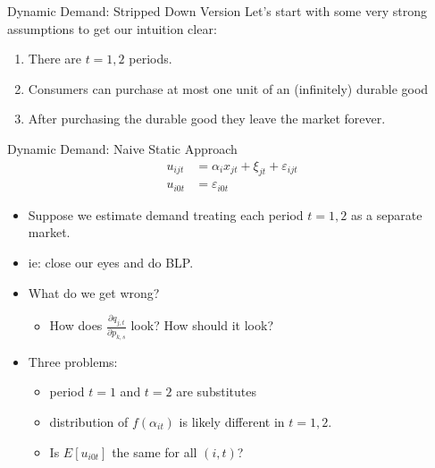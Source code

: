 \documentclass[xcolor=pdftex,dvipsnames,table,mathserif,aspectratio=169]{beamer}
\begin{document}
%




\begin{frame}{Dynamic Demand: Stripped Down Version}
Let's start with some very strong assumptions to get our intuition clear:
\begin{enumerate}
\item There are $t=1,2$ periods.
\item Consumers can purchase at most one unit of an (infinitely) durable good
\item After purchasing the durable good they leave the market forever.
\end{enumerate}
\end{frame}

\begin{frame}{Dynamic Demand: Naive Static Approach}
\begin{align*}
u_{ijt} &=   \alpha_i x_{jt}  +  \xi_{jt} + \varepsilon_{ijt}\\
u_{i0t} &=  \varepsilon_{i0t} 
\end{align*}
\begin{itemize}
\item Suppose  we estimate demand treating each period $t=1,2$ as a \alert{separate market}.
\item ie: close our eyes and do BLP.
\item What do we get wrong?
\begin{itemize}
\item How does $\frac{\partial q_{j,t}}{\partial p_{k,s}}$ look? How should it look?
\end{itemize}
\item Three problems: 
\begin{itemize}
\item period $t=1$ and $t=2$ are \alert{substitutes}
\item distribution of $f(\alpha_{it})$ is likely different in $t=1,2$.
\item Is $E[u_{i0t}]$ the same for all $(i,t)$?
\end{itemize}
\end{itemize}
\end{frame}
\end{document}
